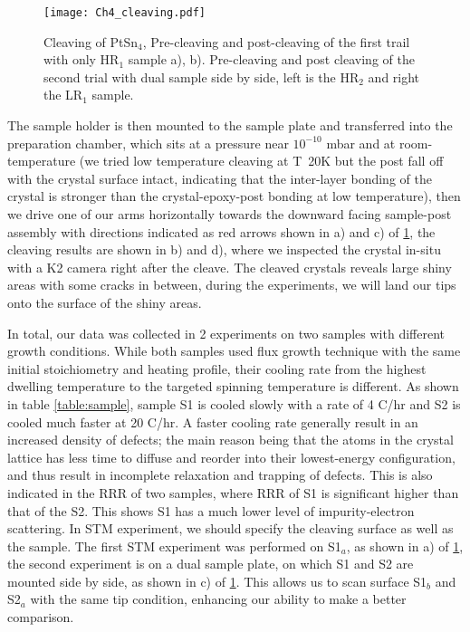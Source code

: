 \begin{figure}
	\centering
	\texttt{[image: Ch4\_cleaving.pdf]}
	\caption{Cleaving of PtSn$_4$, Pre-cleaving and post-cleaving of the first trail with only HR$_1$ sample a), b). Pre-cleaving and post cleaving of the second trial with dual sample side by side, left is the HR$_2$ and right the LR$_1$ sample. }
	\label{fig:ch4_cleaves}
\end{figure}

\par The sample holder is then mounted to the sample plate and transferred into the preparation chamber, which sits at a pressure near $10^{-10}$ mbar and at room-temperature (we tried low temperature cleaving at T~20K but the post fall off with the crystal surface intact, indicating that the inter-layer bonding of the crystal is stronger than the crystal-epoxy-post bonding at low temperature), then we drive one of our arms horizontally towards the downward facing sample-post assembly with directions indicated as red arrows shown in a) and c) of \ref{fig:ch4_cleaves}, the cleaving results are shown in b) and d), where we inspected the crystal in-situ with a K2 camera right after the cleave. The cleaved crystals reveals large shiny areas with some cracks in between, during the experiments, we will land our tips onto the surface of the shiny areas. 

\par In total, our data was collected in 2 experiments on two samples with different growth conditions. While both samples used flux growth technique with the same initial stoichiometry and heating profile, their cooling rate from the highest dwelling temperature to the targeted spinning temperature is different. As shown in table \ref{table:sample}, sample S1 is cooled slowly with a rate of 4 \degree C/hr and S2 is cooled much faster at 20 \degree C/hr. A faster cooling rate generally result in an increased density of defects; the main reason being that the atoms in the crystal lattice has less time to diffuse and reorder into their lowest-energy configuration, and thus result in incomplete relaxation and trapping of defects. This is also indicated in the \ac{RRR} of two samples, where \ac{RRR} of S1 is significant higher than that of the S2. This shows S1 has a much lower level of impurity-electron scattering.
In \ac{STM} experiment, we should specify the cleaving surface as well as the sample. The first \ac{STM} experiment was performed on S1$_a$, as shown in a) of \ref{fig:ch4_cleaves}, the second experiment is on a dual sample plate, on which S1 and S2 are mounted side by side, as shown in c) of \ref{fig:ch4_cleaves}. This allows us to scan surface S1$_b$ and S2$_a$ with the same tip condition, enhancing our ability to make a better comparison.

